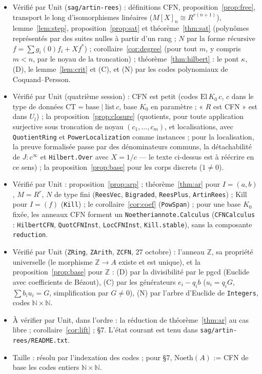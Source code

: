 \documentclass[11pt]{amsart}
\theoremstyle{definition}
\theoremstyle{remark}
\begin{document}
\begin{itemize}
\item Vérifié par Unit (\texttt{sag/artin-rees}) : définitions CFN,
  proposition~\ref{prop:free}, transport le long d'isomorphismes
  linéaires ($M[X]_n\cong R^{r(n+1)}$), lemme~\ref{lem:step},
  proposition~\ref{prop:sat} et théorème~\ref{thm:sat} (polynômes
  représentés par des suites nulles à partir d'un rang ; $N$ par la forme
  récursive $f=\sum g_i(0)f_i+Xf^*$) ; corollaire~\ref{cor:degree}
  (pour tout $m$, y compris $m<n$, par le noyau de la troncation) ;
  théorème~\ref{thm:hilbert} : le pont $\kappa$, (D), le
  lemme~\ref{lem:crit} et (C), et (N) par les codes polynomiaux de
  Coquand--Persson.
\item Vérifié par Unit (quatrième session) : CFN est petit (codes
  $\mathrm{El}\,K_0\,c$, $c$ dans le type de données
  $\mathrm{CT}=\mathrm{base}\mid\mathrm{list}\,c$, base $K_0$ en
  paramètre ; « $R$ est CFN » est dans $U_l$) ; la
  proposition~\ref{prop:closure} (quotients, pour toute application
  surjective sous troncation de noyau $(c_1,\dots,c_m)$, et localisations,
  avec \texttt{QuotientRing} et \texttt{PowerLocalization} comme
  instances ; pour la localisation, la preuve formalisée passe par des
  dénominateurs communs, la détachabilité de $J:c^\infty$ et
  \texttt{Hilbert.Over} avec $X=1/c$ --- le texte ci-dessus est à
  réécrire en ce sens) ; la proposition~\ref{prop:base} pour les corps
  discrets ($1\neq0$).
\item Vérifié par Unit : proposition~\ref{prop:arp} ;
  théorème~\ref{thm:ar} pour $I=(a,b)$, $M=R^r$, $N$ de type fini
  (\texttt{ReesVec}, \texttt{Bigraded}, \texttt{ReesPlus},
  \texttt{ArtinRees}) ; Kill pour $I=(f)$ (\texttt{Kill}) ;
  le corollaire~\ref{cor:coef} (\texttt{PowSpan}) ; pour une base $K_0$
  fixée, les anneaux CFN forment un \texttt{Noetheriannote.Calculus}
  (\texttt{CFNCalculus} : \texttt{HilbertCFN}, \texttt{QuotCFNInst},
  \texttt{LocCFNInst}, \texttt{Kill.stable}), sans la composante
  \texttt{reduction}.
\item Vérifié par Unit (\texttt{ZRing}, \texttt{ZArith}, \texttt{ZCFN},
  27 octobre) : l'anneau $\mathbb Z$, sa propriété universelle (le morphisme
  $\mathbb Z\to A$ existe et est unique), et la proposition~\ref{prop:base}
  pour $\mathbb Z$ : (D) par la divisibilité par le pgcd (Euclide avec
  coefficients de Bézout), (C) par les générateurs $e_i-q_ib$
  ($u_i=q_iG$, $\sum b_iu_i=G$, simplification par $G\neq0$), (N) par
  l'arbre d'Euclide de \texttt{Integers}, codes $\mathbb N\times\mathbb N$.
\item À vérifier par Unit, dans l'ordre : la réduction de théorème~\ref{thm:ar} au cas libre ;
  corollaire~\ref{cor:lift} ; \S7. L'état courant est tenu dans
  \texttt{sag/artin-rees/README.txt}.
\item Taille : résolu par l'indexation des codes ; pour \S7,
  $\mathrm{Noeth}(A)$ := CFN de base les codes entiers $\mathbb N\times\mathbb N$.
\end{itemize}
\end{document}
